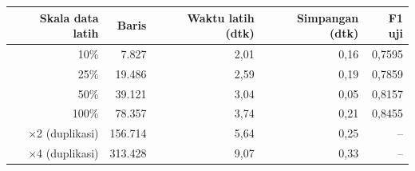 \begin{tabular}{rrrrr}
\toprule
Skala data latih & Baris & Waktu latih (dtk) & Simpangan (dtk) & F1 uji \\
\midrule
10\% & 7.827 & 2,01 & 0,16 & 0,7595 \\
25\% & 19.486 & 2,59 & 0,19 & 0,7859 \\
50\% & 39.121 & 3,04 & 0,05 & 0,8157 \\
100\% & 78.357 & 3,74 & 0,21 & 0,8455 \\
$\times$2 (duplikasi) & 156.714 & 5,64 & 0,25 & -- \\
$\times$4 (duplikasi) & 313.428 & 9,07 & 0,33 & -- \\
\bottomrule
\end{tabular}
